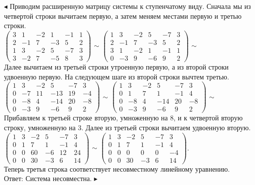\documentclass[a5paper,10pt]{article}
\begin{document}
\medskip
\noindent
$\blacktriangleleft$ Приводим расширенную матрицу системы к ступенчатому виду. Сначала мы из четвертой строки вычитаем первую, а затем меняем местами первую и третью строки.
\\[3pt]
$\left(\begin{array}{rrrrr|r}
3& 1& -2& 1& -1& 1\\
2& -1& 7& -3& 5& 2\\
1& 3& -2& 5& -7& 3\\
3& -2& 7& -5& 8& 3
\end{array}\right)$
$\sim$
$\left(\begin{array}{rrrrr|r}
1& 3& -2& 5& -7& 3\\
2& -1& 7& -3& 5& 2\\
3& 1& -2& 1& -1& 1\\
0& -3& 9& -6& 9& 2
\end{array}\right)$
$\sim$\\[3pt]
Далее вычитаем из третьей строки утроенную первую, а из второй строки удвоенную первую. На следующем шаге из второй строки вычтем третью.\\[3pt]
$\left(\begin{array}{rrrrr|r}
1& 3& -2& 5& -7& 3\\
0& -7& 11& -13& 19& -4\\
0& -8& 4& -14& 20& -8\\
0& -3& 9& -6& 9& 2
\end{array}\right)$
$\sim$
$\left(\begin{array}{rrrrr|r}
1& 3& -2& 5& -7& 3\\
0& 1& 7& 1& -1& 4\\
0& -8& 4& -14& 20& -8\\
0& -3& 9& -6& 9& 2
\end{array}\right)$
$\sim$\\[3pt]
Прибавляем к третьей строке вторую, умноженную на 8, и к четвертой вторую строку, умноженную на 3. Далее из третьей строки вычитаем удвоенную вторую.\\[3pt]
$\left(\begin{array}{rrrrr|r}
1& 3& -2& 5& -7& 3\\
0& 1& 7& 1& -1& 4\\
0& 0& 60& -6& 12& 24\\
0& 0& 30& -3& 6& 14
\end{array}\right)$
$\sim$
$\left(\begin{array}{rrrrr|r}
1& 3& -2& 5& -7& 3\\
0& 1& 7& 1& -1& 4\\
0& 0& 0& 0& 0& -4\\
0& 0& 30& -3& 6& 14
\end{array}\right)$.
\\[3pt]
Теперь третья строка соответствует несовместному линейному уравнению.\\
Ответ: Система несовместна.
$\blacktriangleright$
\end{document}
